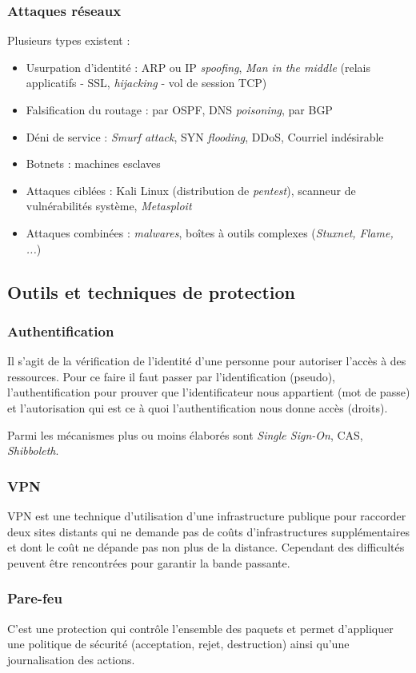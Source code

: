 \documentclass[12pt, a4paper]{article}
\begin{document}
	\subsubsection{Attaques réseaux}
	Plusieurs types existent :
	\begin{itemize}
		\item Usurpation d'identité : ARP ou IP \textit{spoofing}, \textit{Man in the middle} (relais applicatifs - SSL, \textit{hijacking} - vol de session TCP)
		\item Falsification du routage : par OSPF, DNS \textit{poisoning}, par BGP
		\item Déni de service : \textit{Smurf attack}, SYN \textit{flooding}, DDoS, Courriel indésirable
		\item Botnets : machines esclaves
		\item Attaques ciblées : Kali Linux (distribution de \textit{pentest}), scanneur de vulnérabilités système, \textit{Metasploit}
		\item Attaques combinées : \textit{malwares}, boîtes à outils complexes (\textit{Stuxnet, Flame, ...})
	\end{itemize}
	\subsection{Outils et techniques de protection}
	\subsubsection{Authentification}
	Il s'agit de la vérification de l'identité d'une personne pour autoriser l'accès à des ressources. Pour ce faire il faut passer par l'identification (pseudo), l'authentification pour prouver que l'identificateur nous appartient (mot de passe) et l'autorisation qui est ce à quoi l'authentification nous donne accès (droits).
	\par
	Parmi les mécanismes plus ou moins élaborés sont \textit{Single Sign-On}, CAS, \textit{Shibboleth}.
	\subsubsection{VPN}
	VPN est une technique d'utilisation d'une infrastructure publique pour raccorder deux sites distants qui ne demande pas de coûts d'infrastructures supplémentaires et dont le coût ne dépande pas non plus de la distance. Cependant des difficultés peuvent être rencontrées pour garantir la bande passante.
	\subsubsection{Pare-feu}
	C'est une protection qui contrôle l'ensemble des paquets et permet d'appliquer une politique de sécurité (acceptation, rejet, destruction) ainsi qu'une journalisation des actions.
\end{document}
